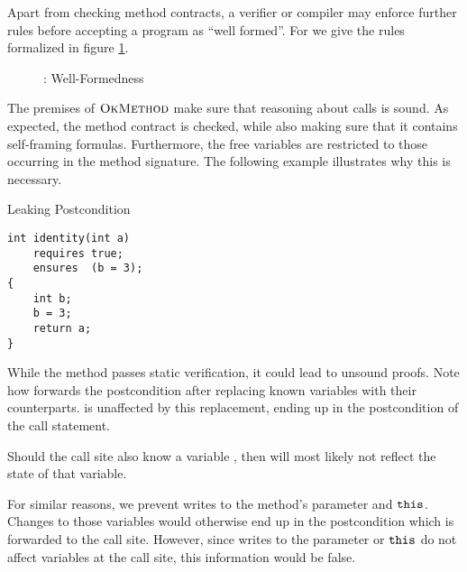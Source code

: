 Apart from checking method contracts, a verifier or compiler may enforce further rules before accepting a program as “well formed”.
For \svlidf we give the rules formalized in figure \ref{fig:idf-wf}.

\begin{figure}[h]
    
    \caption{\svlidf: Well-Formedness}
    \label{fig:idf-wf}
\end{figure}

The premises of $\textup{\textsc{OkMethod}}$ make sure that reasoning about calls is sound.
As expected, the method contract is checked, while also making sure that it contains self-framing formulas.
Furthermore, the free variables are restricted to those occurring in the method signature.
The following example illustrates why this is necessary.

\begin{example}{Leaking Postcondition}
\begin{lstlisting}
int identity(int a)
    requires true;
    ensures  (b = 3);
{
    int b;
    b = 3;
    return a;
}
\end{lstlisting}
While the method passes static verification, it could lead to unsound proofs.
Note how  forwards the postcondition after replacing known variables with their counterparts.
 is unaffected by this replacement, ending up in the postcondition of the call statement.

Should the call site also know a variable , then  will most likely not reflect the state of that variable.
\end{example}

For similar reasons, we prevent writes to the method's parameter and $\textup{\texttt{this}}$.
Changes to those variables would otherwise end up in the postcondition which is forwarded to the call site.
However, since writes to the parameter or $\textup{\texttt{this}}$ do not affect variables at the call site, this information would be false.
